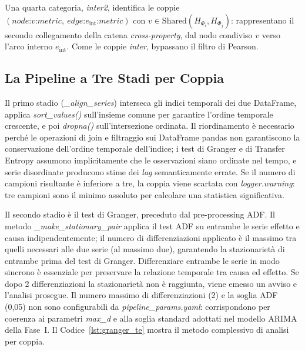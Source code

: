 Una quarta categoria, \textit{inter2}, identifica le coppie
$(\textit{node:}v\textit{:metric},\ \textit{edge:}e_{\text{int}}\textit{:metric})$
con $v \in \text{Shared}(H_{\Phi_i}, H_{\Phi_j})$: rappresentano il secondo
collegamento della catena \textit{cross-property}, dal nodo condiviso $v$
verso l'arco interno $e_{\text{int}}$.
Come le coppie \textit{inter}, bypassano il filtro di Pearson.

\subsection{La Pipeline a Tre Stadi per Coppia}
\label{subsec:causal_pipeline}

Il primo stadio (\textit{\_align\_series}) interseca gli indici temporali dei due DataFrame,
applica \textit{sort\_values()} sull'insieme comune per garantire l'ordine temporale crescente,
e poi \textit{dropna()} sull'intersezione ordinata. Il riordinamento è necessario perché le
operazioni di join e filtraggio sui DataFrame pandas non garantiscono la conservazione dell'ordine
temporale dell'indice; i test di Granger e di Transfer Entropy assumono implicitamente che le
osservazioni siano ordinate nel tempo, e serie disordinate producono stime dei \textit{lag}
semanticamente errate. Se il numero di campioni risultante è inferiore a tre, la coppia viene
scartata con \textit{logger.warning}: tre campioni sono il minimo assoluto per calcolare una
statistica significativa.

Il secondo stadio è il test di Granger, preceduto dal pre-processing \gls{ADF}. Il metodo
\textit{\_make\_stationary\_pair} applica il test \gls{ADF} su entrambe le serie effetto e
causa indipendentemente; il numero di differenziazioni applicato è il massimo tra quelli
necessari alle due serie (al massimo due), garantendo la stazionarietà di entrambe prima del
test di Granger. Differenziare entrambe le serie in modo sincrono è essenziale per preservare
la relazione temporale tra causa ed effetto. Se dopo 2 differenziazioni la stazionarietà non
è raggiunta, viene emesso un avviso e l'analisi prosegue. Il numero massimo di
differenziazioni (2) e la soglia ADF (0,05) non sono configurabili da
\textit{pipeline\_params.yaml}: corrispondono per coerenza ai parametri \textit{max\_d} e alla
soglia standard adottati nel modello ARIMA della Fase~I. Il Codice~\ref{lst:granger_te} mostra
il metodo complessivo di analisi per coppia.

